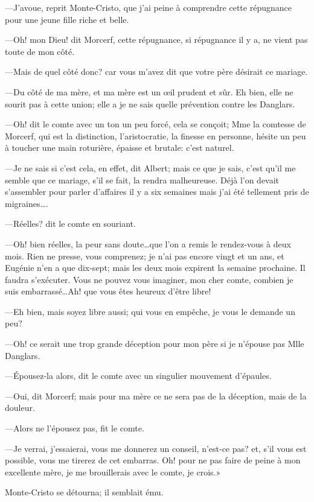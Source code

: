 —J'avoue, reprit Monte-Cristo, que j'ai peine à comprendre cette répugnance pour une jeune fille riche et belle. 

—Oh! mon Dieu! dit Morcerf, cette répugnance, si répugnance il y a, ne vient pas toute de mon côté. 

—Mais de quel côté donc? car vous m'avez dit que votre père désirait ce mariage. 

—Du côté de ma mère, et ma mère est un œil prudent et sûr. Eh bien, elle ne sourit pas à cette union; elle a je ne sais quelle prévention contre les Danglars. 

—Oh! dit le comte avec un ton un peu forcé, cela se conçoit; Mme la comtesse de Morcerf, qui est la distinction, l'aristocratie, la finesse en personne, hésite un peu à toucher une main roturière, épaisse et brutale: c'est naturel. 

—Je ne sais si c'est cela, en effet, dit Albert; mais ce que je sais, c'est qu'il me semble que ce mariage, s'il se fait, la rendra malheureuse. Déjà l'on devait s'assembler pour parler d'affaires il y a six semaines mais j'ai été tellement pris de migraines\dots. 

—Réelles? dit le comte en souriant. 

—Oh! bien réelles, la peur sans doute\dots que l'on a remis le rendez-vous à deux mois. Rien ne presse, vous comprenez; je n'ai pas encore vingt et un ans, et Eugénie n'en a que dix-sept; mais les deux mois expirent la semaine prochaine. Il faudra s'exécuter. Vous ne pouvez vous imaginer, mon cher comte, combien je suis embarrassé\dots Ah! que vous êtes heureux d'être libre! 

—Eh bien, mais soyez libre aussi; qui vous en empêche, je vous le demande un peu? 

—Oh! ce serait une trop grande déception pour mon père si je n'épouse pas Mlle Danglars. 

—Épousez-la alors, dit le comte avec un singulier mouvement d'épaules. 

—Oui, dit Morcerf; mais pour ma mère ce ne sera pas de la déception, mais de la douleur. 

—Alors ne l'épousez pas, fit le comte. 

—Je verrai, j'essaierai, vous me donnerez un conseil, n'est-ce pas? et, s'il vous est possible, vous me tirerez de cet embarras. Oh! pour ne pas faire de peine à mon excellente mère, je me brouillerais avec le comte, je crois.» 

Monte-Cristo se détourna; il semblait ému. 

